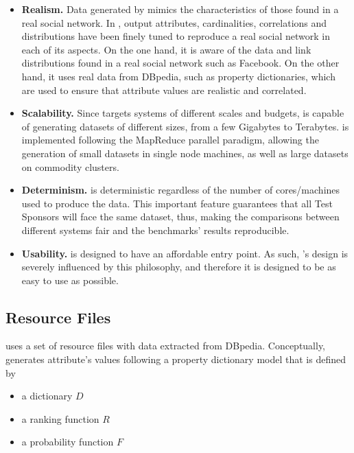 \begin{itemize}
    \item \textbf{Realism.} Data generated by \datagen mimics the
        characteristics of those found in a real social network. In \datagen,
        output attributes, cardinalities, correlations and distributions have
        been finely tuned to reproduce a real social network in each of its
        aspects. On the one hand, it is aware of the  data and link distributions
        found in a real social network such as Facebook. On the other hand, it
        uses real data from DBpedia, such as property dictionaries, which are
        used to ensure that attribute values are realistic and correlated.
    \item \textbf{Scalability.} Since \ldbcsnb targets systems of different
        scales and budgets, \datagen is capable of generating datasets of
        different sizes, from a few Gigabytes to Terabytes. \datagen is
        implemented following the MapReduce parallel paradigm, allowing the
        generation of small datasets in single node machines, as well as large
        datasets on commodity clusters.
    \item \textbf{Determinism.} \datagen is deterministic regardless of the number
        of cores/machines used to produce the data. This important feature
        guarantees that all Test Sponsors will face the same dataset,
        thus, making the comparisons between different systems fair and the
        benchmarks' results reproducible.
    \item \textbf{Usability.} \ldbcsnb is designed to have an affordable entry
        point. As such, \datagen's design is  severely influenced by this
        philosophy, and therefore it is designed to be as easy to use as
        possible.
\end{itemize}


\subsection{Resource Files}

\datagen uses a set of resource files with data
extracted from DBpedia. Conceptually, \datagen generates attribute's
values following a property dictionary model that is defined by

\begin{itemize}
    \item a dictionary $D$
    \item a ranking function $R$
    \item a probability function $F$
\end{itemize}

